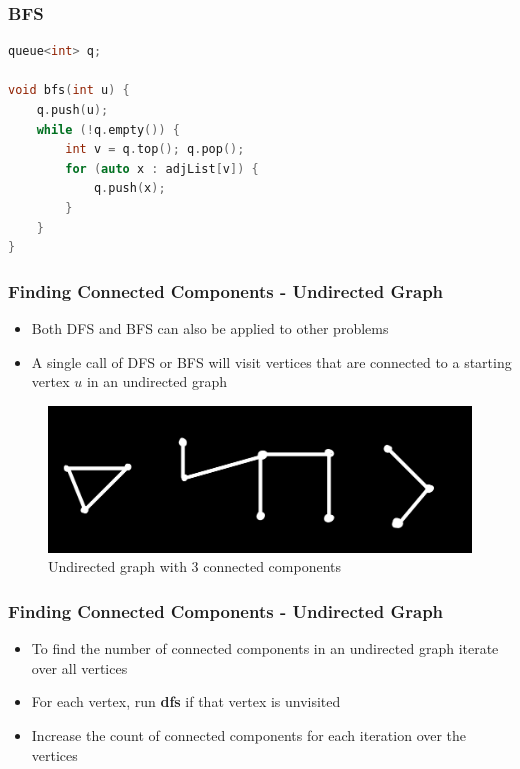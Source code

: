 \documentclass{beamer}
\begin{document}
\begin{frame}[fragile]
\frametitle{BFS}

\begin{lstlisting}[language=c]
queue<int> q;

void bfs(int u) {
	q.push(u);
	while (!q.empty()) {
		int v = q.top(); q.pop();
		for (auto x : adjList[v]) {
			q.push(x);
		}
	}
}
\end{lstlisting}

\end{frame}

\begin{frame}[fragile]
\frametitle{Finding Connected Components - Undirected Graph}

\begin{itemize}
    \item Both DFS and BFS can also be applied to other problems
    \item A single call of DFS or BFS will visit vertices that are connected to a starting vertex $u$ in an undirected graph
\end{itemize}

\begin{figure}[H]
    \centering
    \includegraphics[scale=0.1]{imgs/non_connected_graph.jpeg}
    \caption{Undirected graph with 3 connected components}
\end{figure}

\end{frame}

\begin{frame}[fragile]
\frametitle{Finding Connected Components - Undirected Graph}

\begin{itemize}
    \item To find the number of connected components in an undirected graph iterate over all vertices
    \item For each vertex, run \textbf{dfs} if that vertex is unvisited
    \item Increase the count of connected components for each iteration over the vertices
\end{itemize}

\end{frame}
\end{document}
